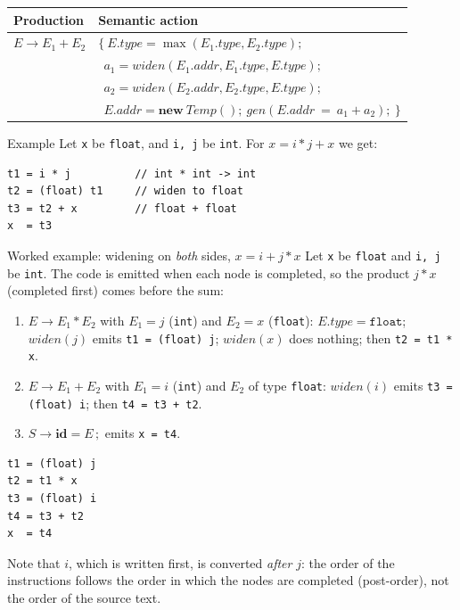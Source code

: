 \documentclass[11pt,a4paper]{article}
\newcommand{\at}[2]{\ensuremath{#1.\mathit{#2}}}
\newcommand{\tok}[1]{\ensuremath{\mathtt{#1}}}
\begin{document}
\begin{center}
\small
\begin{tabular}{@{}L{3.1cm} L{11.4cm}@{}}
\toprule
\textbf{Production} & \textbf{Semantic action} \\ \midrule
$E \to E_1 + E_2$ &
$\{\ \at{E}{type}=\max(\at{E_1}{type},\at{E_2}{type});$\\
& $\ \ a_1=\mathit{widen}(\at{E_1}{addr},\at{E_1}{type},\at{E}{type});$\\
& $\ \ a_2=\mathit{widen}(\at{E_2}{addr},\at{E_2}{type},\at{E}{type});$\\
& $\ \ \at{E}{addr}=\mathbf{new}\ \mathit{Temp}();\ \mathit{gen}(\at{E}{addr}\ \tok{=}\ a_1\ \tok{+}\ a_2);\ \}$ \\ \bottomrule
\end{tabular}
\end{center}

\begin{examplebox}{Example}
Let \texttt{x} be \texttt{float}, and \texttt{i, j} be \texttt{int}. For $x = i * j + x$ we get:
\begin{lstlisting}
t1 = i * j          // int * int -> int
t2 = (float) t1     // widen to float
t3 = t2 + x         // float + float
x  = t3
\end{lstlisting}
\end{examplebox}

\begin{examplebox}{Worked example: widening on \emph{both} sides, $x = i + j * x$}
Let \texttt{x} be \texttt{float} and \texttt{i, j} be \texttt{int}. The code is emitted when each node is completed, so the product $j*x$ (completed first) comes before the sum:
\begin{enumerate}[nosep]
\item $E\to E_1*E_2$ with $E_1=j$ (\texttt{int}) and $E_2=x$ (\texttt{float}): $E.type=\texttt{float}$; $\mathit{widen}(j)$ emits \texttt{t1 = (float) j}; $\mathit{widen}(x)$ does nothing; then \texttt{t2 = t1 * x}.
\item $E\to E_1+E_2$ with $E_1=i$ (\texttt{int}) and $E_2$ of type \texttt{float}: $\mathit{widen}(i)$ emits \texttt{t3 = (float) i}; then \texttt{t4 = t3 + t2}.
\item $S\to\mathbf{id}=E\,;$ emits \texttt{x = t4}.
\end{enumerate}
\begin{lstlisting}
t1 = (float) j
t2 = t1 * x
t3 = (float) i
t4 = t3 + t2
x  = t4
\end{lstlisting}
Note that $i$, which is written first, is converted \emph{after} $j$: the order of the instructions follows the order in which the nodes are completed (post-order), not the order of the source text.
\end{examplebox}
\end{document}

